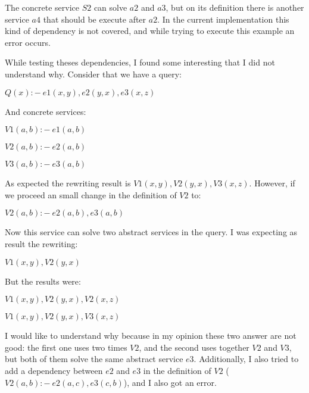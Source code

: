 \documentclass[12pt,a4paper,oneside]{report}
\begin{document}
The concrete service $S2$ can solve $a2$ and $a3$, but on its definition there is another service $a4$ that should be execute after $a2$. In the current implementation this kind of dependency is not covered, and while trying to execute this example an error occurs. 

\bigskip
While testing theses dependencies, I found some interesting that I did not understand why. Consider that we have a query:

\begin{description}
\item $Q(x) :-  \ e1(x,y),e2(y,x),e3(x,z)$
\end{description}

  And concrete services:
  
\begin{description}
\item $V1(a,b) :- \ e1(a,b)$
\item $V2(a,b) :- \ e2(a,b)$
\item $V3(a,b) :- \ e3(a,b)$
\end{description}
  
  As expected the rewriting result is $V1(x,y),V2(y,x),V3(x,z)$. However, if we proceed an small change in the definition of $V2$ to:

\begin{description}
\item $V2(a,b) :- \ e2(a,b),e3(a,b)$
\end{description}  
  
   Now this service can solve two abstract services in the query. I was expecting as result the rewriting:

\begin{description}
\item $V1(x,y),V2(y,x)$
\end{description}    


    But the results were: 

\begin{description}
\item $V1(x,y),V2(y,x),V2(x,z)$
\item $V1(x,y),V2(y,x),V3(x,z)$
\end{description}  
  
I would like to understand why because in my opinion these two answer are not good: the first one uses two times $V2$, and the second uses together $V2$ and $V3$, but both of them solve the same abstract service $e3$. 
Additionally, I also tried to add a dependency between $e2$ and $e3$ in the definition of $V2$ ($V2(a,b) :- \ e2(a,c),e3(c,b)$), and I also got an error.
\end{document}
